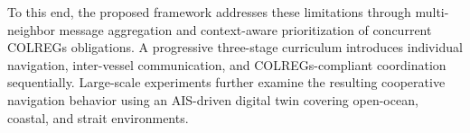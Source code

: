 \documentclass[final,5p,times,twocolumn]{elsarticle}
\begin{document}
{To this end, the proposed framework addresses these limitations through multi-neighbor message aggregation and context-aware prioritization of concurrent COLREGs obligations. A progressive three-stage curriculum introduces individual navigation, inter-vessel communication, and COLREGs-compliant coordination sequentially. Large-scale experiments further examine the resulting cooperative navigation behavior using an AIS-driven digital twin covering open-ocean, coastal, and strait environments.
}



\end{document}
